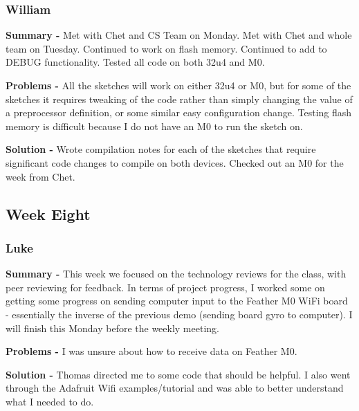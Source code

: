 \documentclass[onecolumn, draftclsnofoot,10pt, compsoc]{IEEEtran}
\begin{document}
\subsubsection*{William}
    \begin{adjustwidth}{2.5em}{0pt}
    \textbf{Summary -} Met with Chet and CS Team on Monday. Met with Chet and whole team on Tuesday. Continued to work on flash memory. Continued to add to DEBUG functionality. Tested all code on both 32u4 and M0. 
    
    \textbf{Problems -} All the sketches will work on either 32u4 or M0, but for some of the sketches it requires tweaking of the code rather than simply changing the value of a preprocessor definition, or some similar easy configuration change. Testing flash memory is difficult because I do not have an M0 to run the sketch on.
    \end{adjustwidth}
    \begin{adjustwidth}{5em}{0pt}
    \textbf{Solution -} Wrote compilation notes for each of the sketches that require significant code changes to compile on both devices. Checked out an M0 for the week from Chet.
    \end{adjustwidth}



\subsection{Week Eight}
\subsubsection*{Luke}
    \begin{adjustwidth}{2.5em}{0pt}
    \textbf{Summary -} This week we focused on the technology reviews for the class, with peer reviewing for feedback. In terms of project progress, I worked some on getting some progress on sending computer input to the Feather M0 WiFi board - essentially the inverse of the previous demo (sending board gyro to computer). I will finish this Monday before the weekly meeting.
    
    \textbf{Problems -} I was unsure about how to receive data on Feather M0.
    \end{adjustwidth}
    \begin{adjustwidth}{5em}{0pt}
    \textbf{Solution -} Thomas directed me to some code that should be helpful. I also went 
    through the Adafruit Wifi examples/tutorial and was able to better understand what I needed to do.   
    \end{adjustwidth}
\end{document}
